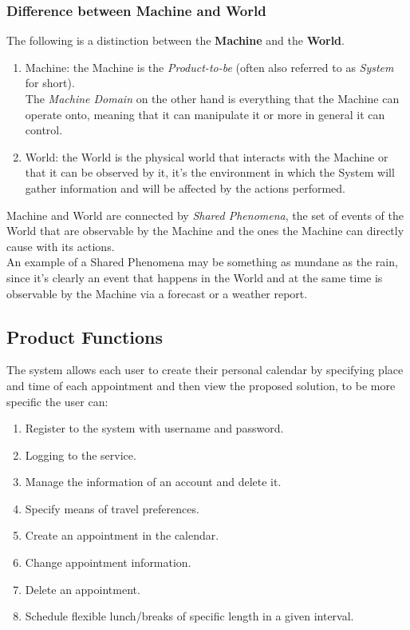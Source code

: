 \subsubsection*{Difference between Machine and World}
The following is a distinction between the \textbf{Machine} and the \textbf{World}.
\begin{enumerate}
\item Machine: the Machine is the \textit{Product-to-be} (often also referred to as \textit{System} for short).
\\The \textit{Machine Domain} on the other hand is everything that the Machine can operate onto, meaning that it can manipulate it or more in general it can control.
\item World: the World is the physical world that interacts with the Machine or that it can be observed by it, it's the environment in which the System will gather information and will be affected by the actions performed.
\end{enumerate}
Machine and World are connected by \textit{Shared Phenomena}, the set of events of the World that are observable by the Machine and the ones the Machine can directly cause with its actions.
\\An example of a Shared Phenomena may be something as mundane as the rain, since it's clearly an event that happens in the World and at the same time is observable by the Machine via a forecast or a weather report.
\clearpage
\subsection{Product Functions}
The system allows each user to create their personal calendar by specifying place and time of each appointment and then view the proposed solution, to be more specific the user can:
\begin{enumerate}
\item Register to the system with username and password.
\item Logging to the service.
\item Manage the information of an account and delete it.
\item Specify means of travel preferences.
\item Create an appointment in the calendar.
\item Change appointment information.
\item Delete an appointment.
\item Schedule flexible lunch/breaks of specific length in a given interval.
\end{enumerate}
\par
